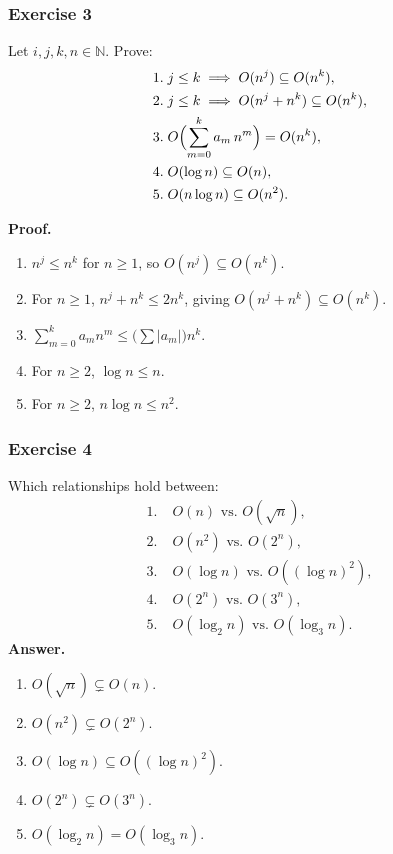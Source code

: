 \documentclass{article}
\theoremstyle{theorem}
\theoremstyle{definition}
\theoremstyle{remark}
\begin{document}
\subsubsection*{Exercise 3}
Let \(i,j,k,n\in\mathbb N\). Prove:
\[
\begin{aligned}
1.\;&j\le k\implies O(n^j)\subseteq O(n^k),\\
2.\;&j\le k\implies O(n^j+n^k)\subseteq O(n^k),\\
3.\;&O\Bigl(\sum_{m=0}^k a_m\,n^m\Bigr)=O(n^k),\\
4.\;&O(\log n)\subseteq O(n),\\
5.\;&O(n\log n)\subseteq O(n^2).
\end{aligned}
\]

\newpage

\textbf{Proof.}
\begin{enumerate}[label=\arabic*.]
  \item \(n^j\le n^k\) for \(n\ge1\), so \(O(n^j)\subseteq O(n^k)\).
  \item For \(n\ge1\), \(n^j+n^k\le2n^k\), giving \(O(n^j+n^k)\subseteq O(n^k)\).
  \item \(\sum_{m=0}^k a_m n^m\le \bigl(\sum|a_m|\bigr)n^k\).
  \item For \(n\ge2\), \(\log n\le n\).
  \item For \(n\ge2\), \(n\log n\le n^2\).
\end{enumerate}

\subsubsection*{Exercise 4}
Which relationships hold between:
\[
\begin{aligned}
1.\;&O(n)\text{ vs.\ }O(\sqrt n),\\
2.\;&O(n^2)\text{ vs.\ }O(2^n),\\
3.\;&O(\log n)\text{ vs.\ }O((\log n)^2),\\
4.\;&O(2^n)\text{ vs.\ }O(3^n),\\
5.\;&O(\log_2n)\text{ vs.\ }O(\log_3n).
\end{aligned}
\]
\textbf{Answer.}
\begin{enumerate}[label=\arabic*.]
  \item \(O(\sqrt n)\subsetneq O(n)\).
  \item \(O(n^2)\subsetneq O(2^n)\).
  \item \(O(\log n)\subseteq O((\log n)^2)\).
  \item \(O(2^n)\subsetneq O(3^n)\).
  \item \(O(\log_2n)=O(\log_3n)\).
\end{enumerate}
\end{document}

